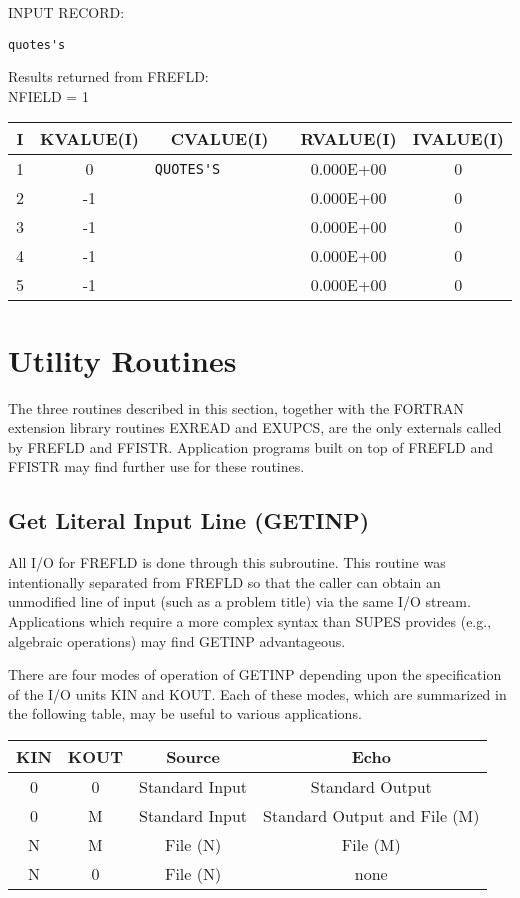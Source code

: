 INPUT RECORD:
\begin{verbatim}
quotes's
\end{verbatim}

Results returned from FREFLD:\\
NFIELD =    1

\begin{tabular}{|ccccc|} \hline \hline
I    &  KVALUE(I) &       CVALUE(I)       &   RVALUE(I)   &  IVALUE(I)\\\hline
1 &   0  &\verb*"QUOTES'S        "  &    0.000E+00 &  0\\
2 &  -1  &\verb*"                "  &    0.000E+00 &  0\\
3 &  -1  &\verb*"                "  &    0.000E+00 &  0\\
4 &  -1  &\verb*"                "  &    0.000E+00 &  0\\
5 &  -1  &\verb*"                "  &    0.000E+00 &  0\\ \hline \hline
\end{tabular}

\section{Utility Routines}
The three routines described in this section, together with the FORTRAN
extension library routines EXREAD and EXUPCS, are the only externals called
by FREFLD and FFISTR. Application programs built on top of FREFLD and FFISTR
may find further use for these routines.


\subsection{Get Literal Input Line (GETINP)}\label{sec:getinp}
All I/O for FREFLD is done through this subroutine.  This routine was
intentionally separated from FREFLD so that the caller can obtain an
unmodified line of input (such as a problem title) via the same I/O stream.
Applications which require a more complex syntax than SUPES provides (e.g.,
algebraic operations) may find GETINP advantageous.

There are four modes of operation of GETINP depending upon the specification
of the I/O units KIN and KOUT.  Each of these modes, which are summarized in
the following table, may be useful to various applications.

\begin{tabular}{|cccc|} \hline \hline
     KIN        &KOUT    &Source  &Echo\\\hline
        0       &0       &Standard Input  &Standard Output\\
        0       &M       &Standard Input  &Standard Output and File (M)\\
     N         &M       &File (N)        &File (M)\\
        N       &0       &File (N)        &none \\ \hline \hline
\end{tabular}

